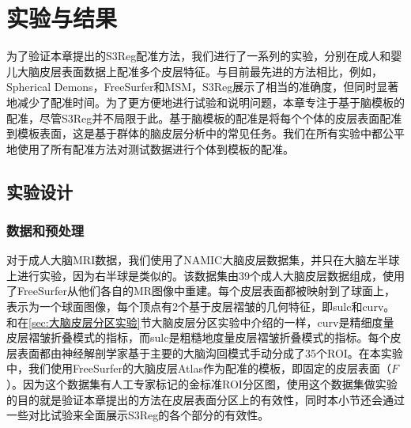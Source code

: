 

\section{实验与结果}
为了验证本章提出的S3Reg配准方法，我们进行了一系列的实验，分别在成人和婴儿大脑皮层表面数据上配准多个皮层特征。与目前最先进的方法相比，例如，Spherical Demons\cite{yeo2009spherical}，FreeSurfer\cite{fischl1999high}和MSM\cite{robinson2014msm}，S3Reg展示了相当的准确度，但同时显著地减少了配准时间。为了更方便地进行试验和说明问题，本章专注于基于脑模板的配准，尽管S3Reg并不局限于此。基于脑模板的配准是将每个个体的皮层表面配准到模板表面，这是基于群体的脑皮层分析中的常见任务。我们在所有实验中都公平地使用了所有配准方法对测试数据进行个体到模板的配准。

\subsection{实验设计}
\subsubsection{数据和预处理}\label{sec:S3Reg的数据和预处理}
对于成人大脑MRI数据，我们使用了NAMIC大脑皮层数据集\cite{namic}，并只在大脑左半球上进行实验，因为右半球是类似的。该数据集由39个成人大脑皮层数据组成，使用了FreeSurfer\cite{dale1999cortical}从他们各自的MR图像中重建。每个皮层表面都被映射到了球面上，表示为一个球面图像，每个顶点有2个基于皮层褶皱的几何特征，即sulc和curv\cite{fischl2012freesurfer}。和在\ref{sec:大脑皮层分区实验}节大脑皮层分区实验中介绍的一样，curv是精细度量皮层褶皱折叠模式的指标，而sulc是粗糙地度量皮层褶皱折叠模式的指标。每个皮层表面都由神经解剖学家基于主要的大脑沟回模式\cite{desikan2006automated}手动分成了35个ROI。在本实验中，我们使用FreeSurfer的大脑皮层Atlas\cite{fischl2012freesurfer}作为配准的模板，即固定的皮层表面（$F$）。因为这个数据集有人工专家标记的金标准ROI分区图，使用这个数据集做实验的目的就是验证本章提出的方法在皮层表面分区上的有效性，同时本小节还会通过一些对比试验来全面展示S3Reg的各个部分的有效性。


